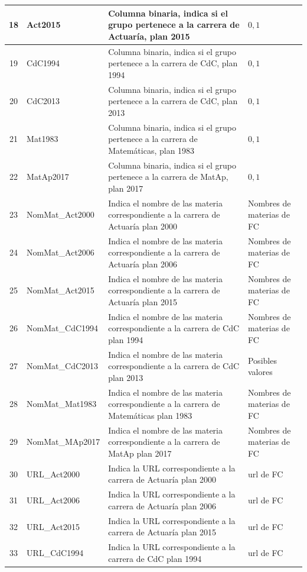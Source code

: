 {\begin{longtable}{|c|l|p{7.5cm}|p{3.5cm}|}
\hline 
18 & Act2015 & Columna binaria, indica si el grupo pertenece a la carrera de Actuaría, plan 2015 & $0,1$ \\ 
\hline 
19 & CdC1994 & Columna binaria, indica si el grupo pertenece a la carrera de CdC, plan 1994 & $0,1$ \\ 
\hline 
20 & CdC2013 & Columna binaria, indica si el grupo pertenece a la carrera de CdC, plan 2013 & $0,1$ \\ 
\hline 
21 & Mat1983 & Columna binaria, indica si el grupo pertenece a la carrera de Matemáticas, plan 1983 & $0,1$ \\ 
\hline 
22 & MatAp2017 & Columna binaria, indica si el grupo pertenece a la carrera de MatAp, plan 2017 & $0,1$ \\ 
\hline 
23 & NomMat\_Act2000 & Indica el nombre de las materia correspondiente a la carrera de Actuaría plan 2000 & Nombres de materias de FC \\ 
\hline 
24 & NomMat\_Act2006 & Indica el nombre de las materia correspondiente a la carrera de Actuaría plan 2006 & Nombres de materias de FC \\ 
\hline 
25 & NomMat\_Act2015 & Indica el nombre de las materia correspondiente a la carrera de Actuaría plan 2015 & Nombres de materias de FC \\ 
\hline 
26 & NomMat\_CdC1994 & Indica el nombre de las materia correspondiente a la carrera de CdC plan 1994 & Nombres de materias de FC \\ 
\hline 
27 & NomMat\_CdC2013 & Indica el nombre de las materia correspondiente a la carrera de CdC plan 2013 & Posibles valores \\ 
\hline 
28 & NomMat\_Mat1983 & Indica el nombre de las materia correspondiente a la carrera de Matemáticas plan 1983 & Nombres de materias de FC \\ 
\hline 
29 & NomMat\_MAp2017 & Indica el nombre de las materia correspondiente a la carrera de MatAp plan 2017 & Nombres de materias de FC \\ 
\hline 
30 & URL\_Act2000 & Indica la URL correspondiente a la carrera de Actuaría plan 2000 & url de FC \\ 
\hline 
31 & URL\_Act2006 & Indica la URL correspondiente a la carrera de Actuaría plan 2006 & url de FC \\ 
\hline 
32 & URL\_Act2015 & Indica la URL correspondiente a la carrera de Actuaría plan 2015 & url de FC \\ 
\hline 
33 & URL\_CdC1994 & Indica la URL correspondiente a la carrera de CdC plan 1994 & url de FC \\ 

\end{longtable}}
